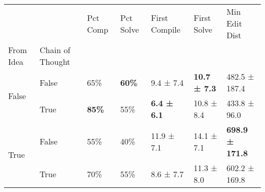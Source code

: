 \begin{tabular}{lllllll}
\toprule
 &  & Pct Comp & Pct Solve & First Compile & First Solve & Min Edit Dist \\
From Idea & Chain of Thought &  &  &  &  &  \\
\midrule
\multirow[t]{2}{*}{False} & False & 65\% & \textbf{60\%} & 9.4 ± 7.4 & \textbf{10.7 ± 7.3} & 482.5 ± 187.4 \\
 & True & \textbf{85\%} & 55\% & \textbf{6.4 ± 6.1} & 10.8 ± 8.4 & 433.8 ± 96.0 \\
\cline{1-7}
\multirow[t]{2}{*}{True} & False & 55\% & 40\% & 11.9 ± 7.1 & 14.1 ± 7.1 & \textbf{698.9 ± 171.8} \\
 & True & 70\% & 55\% & 8.6 ± 7.7 & 11.3 ± 8.0 & 602.2 ± 169.8 \\
\cline{1-7}
\bottomrule
\end{tabular}
